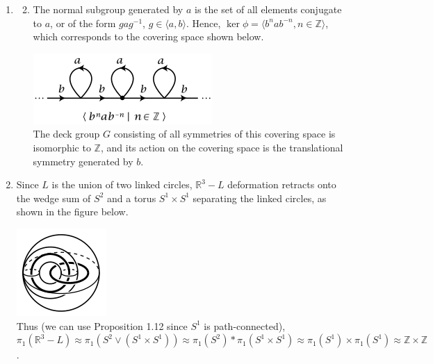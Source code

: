 \documentclass[a4paper,12pt]{article}
\begin{document}
\begin{enumerate}
    \item
        \begin{enumerate}[label=(\alph*)]
            \setcounter{enumii}{1}
            \item
                The normal subgroup generated by $a$ is the set of all elements conjugate to $a$, or of the form $gag^{-1}$, $g \in \langle a, b \rangle$. %
                Hence, $\ker\phi = \langle b^n a b^{-n}, n \in \mathbb{Z} \rangle$, which corresponds to the covering space shown below. \par
                {\centering
                    \includegraphics[scale=1]{midterm_3b}
                \\}
                The deck group $G$ consisting of all symmetries of this covering space is isomorphic to $\mathbb{Z}$, and its action on the covering space is the translational symmetry generated by $b$.
        \end{enumerate}

    \item
        Since $L$ is the union of two linked circles, $\mathbb{R}^3 - L$ deformation retracts onto the wedge sum of $S^2$ and a torus $S^1 \times S^1$ separating the linked circles, as shown in the figure below. \par
        {\centering
            \includegraphics[scale=1]{midterm_4}
        \\}
        Thus (we can use Proposition 1.12 since $S^1$ is path-connected), $\pi_1(\mathbb{R}^3 - L) \approx \pi_1(S^2 \lor (S^1 \times S^1)) \approx \pi_1(S^2) * \pi_1(S^1 \times S^1) \approx \pi_1(S^1) \times \pi_1(S^1) \approx \mathbb{Z} \times \mathbb{Z}$.

\end{enumerate}
\end{document}
